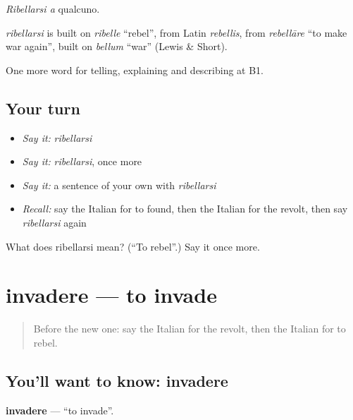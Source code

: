\emph{Ribellarsi a} qualcuno.

\begin{cousinweb}
\emph{ribellarsi} is built on \emph{ribelle} \textquotedblleft{}rebel\textquotedblright{}, from Latin \emph{rebellis}, from \emph{rebellāre} \textquotedblleft{}to make war again\textquotedblright{}, built on \emph{bellum} \textquotedblleft{}war\textquotedblright{} (Lewis \& Short).
\end{cousinweb}

\begin{grammarlens}[title={What you've built}]
One more word for telling, explaining and describing at B1.
\end{grammarlens}

\subsection*{Your turn}
\begin{itemize}
\raggedright
  \item \emph{Say it:} \emph{ribellarsi}
  \item \emph{Say it:} \emph{ribellarsi}, once more
  \item \emph{Say it:} a sentence of your own with \emph{ribellarsi}
  \item \emph{Recall:} say the Italian for to found, then the Italian for the revolt, then say \emph{ribellarsi} again
\end{itemize}

\begin{tcolorbox}[breakable,colback=teal!4,colframe=teal!35!black,title={Before you move on}]
What does ribellarsi mean? (\textquotedblleft{}To rebel\textquotedblright{}.) Say it once more.
\end{tcolorbox}
\section[invadere]{invadere — to invade}

\label{lesson:IT-C329-invadere}



\begin{quote}
Before the new one: say the Italian for the revolt, then the Italian for to rebel.
\end{quote}

\subsection*{You'll want to know: invadere}
\textbf{invadere} — \textquotedblleft{}to invade\textquotedblright{}.

